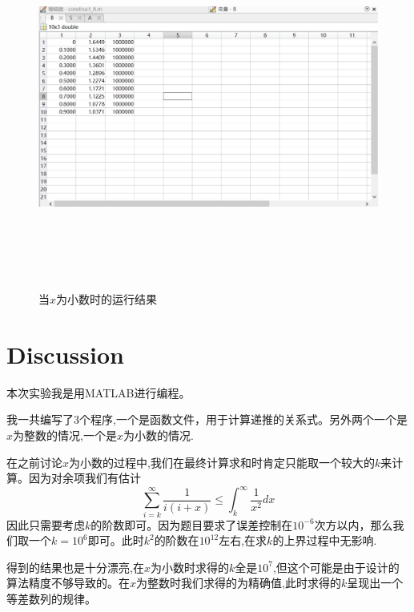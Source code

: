 \documentclass{article}
\begin{document}
	\begin{figure}[t]
	 \begin{center}
		
		\includegraphics[width=12cm,height=12cm]{float}
		
		\caption{当$x$为小数时的运行结果} \label{figure.label}
	\end{center}
\end{figure}

\section{Discussion}

本次实验我是用MATLAB进行编程。

我一共编写了3个程序,一个是函数文件，用于计算递推的关系式。另外两个一个是$x$为整数的情况,一个是$x$为小数的情况.

在之前讨论$x$为小数的过程中,我们在最终计算求和时肯定只能取一个较大的$k$来计算。因为对余项我们有估计
$$\sum_{i=k}^{\infty}\frac{1}{i(i+x)} \leq \int_{k}^{\infty}\frac{1}{x^2}dx$$
因此只需要考虑$k$的阶数即可。因为题目要求了误差控制在$10^{-6}$次方以内，那么我们取一个$k=10^6$即可。此时$k^2$的阶数在$10^{12}$左右,在求$k$的上界过程中无影响.

得到的结果也是十分漂亮,在$x$为小数时求得的$k$全是$10^7$,但这个可能是由于设计的算法精度不够导致的。在$x$为整数时我们求得的为精确值,此时求得的$k$呈现出一个等差数列的规律。

\appendix
\end{document}
